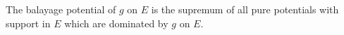 The balayage potential of $g$ on $E$ is the supremum of all pure potentials with support in $E$ which are dominated by $g$ on $E$.
